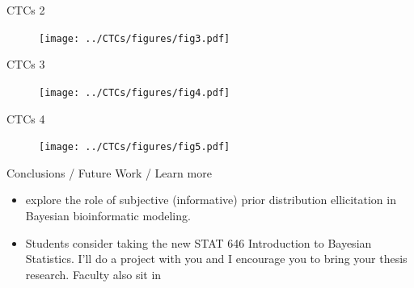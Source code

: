 \documentclass[ignorenonframetext,aspectratio=169,]{beamer}
\providecommand{\tightlist}{%
  \setlength{\itemsep}{0pt}\setlength{\parskip}{0pt}}
\begin{document}
\begin{frame}{%
\protect\hypertarget{ctcs-2}{%
CTCs 2}}

\begin{figure}[htb]
  \centering \texttt{[image: ../CTCs/figures/fig3.pdf]}
\end{figure}

\end{frame}

\begin{frame}{%
\protect\hypertarget{ctcs-3}{%
CTCs 3}}

\begin{figure}[htb]
  \centering \texttt{[image: ../CTCs/figures/fig4.pdf]}
\end{figure}

\end{frame}

\begin{frame}{%
\protect\hypertarget{ctcs-4}{%
CTCs 4}}

\begin{figure}[htb]
  \centering \texttt{[image: ../CTCs/figures/fig5.pdf]}
\end{figure}

\end{frame}

\begin{frame}{%
\protect\hypertarget{conclusions-future-work-learn-more}{%
Conclusions / Future Work / Learn more}}

\begin{itemize}
\tightlist
\item
  explore the role of subjective (informative) prior distribution
  ellicitation in Bayesian bioinformatic modeling.
\item
  Students consider taking the new STAT 646 Introduction to Bayesian
  Statistics. I’ll do a project with you and I encourage you to bring
  your thesis research. Faculty also sit in
\end{itemize}

\end{frame}
\end{document}
